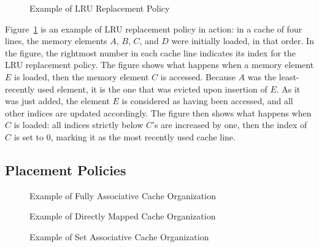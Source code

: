 \begin{figure}[hbt!]
\begin{center}

\end{center}
\caption{Example of LRU Replacement Policy}
\label{fig:replacement:lru}
\end{figure}

Figure~\ref{fig:replacement:lru} is an example of LRU replacement
policy in action: in a cache of four lines, the memory elements $A$, $B$, $C$,
and $D$ were initially loaded, in that order. In the figure, the rightmost
number in each cache line indicates its index for the LRU replacement policy.
The figure shows what happens when a memory element $E$ is loaded, then the
memory element $C$ is accessed. Because $A$ was the least-recently used element,
it is the one that was evicted upon insertion of $E$. As it was just added, the
element $E$ is considered as having been accessed, and all other indices are
updated accordingly. The figure then shows what happens when $C$ is loaded: all
indices strictly below $C$'s are increased by one, then the index of $C$ is set
to $0$, marking it as the most recently used cache line.

\subsection{Placement Policies}
\begin{figure}[hbt!]
\begin{center}

\end{center}
\caption{Example of Fully Associative Cache Organization}
\label{fig:placement:fully_associative}
\end{figure}

\begin{figure}[hbt!]
\begin{center}

\end{center}
\caption{Example of Directly Mapped Cache Organization}
\label{fig:placement:direct_map}
\end{figure}

\begin{figure}[hbt!]
\begin{center}

\end{center}
\caption{Example of Set Associative Cache Organization}
\label{fig:placement:set_associative}
\end{figure}

